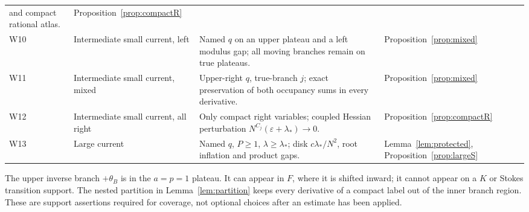 \documentclass[11pt]{article}
\numberwithin{equation}{section}
\theoremstyle{definition}
\newcommand{\eps}{\varepsilon}
\begin{document}
\begin{longtable}{>{\raggedright\arraybackslash}p{}>{\raggedright\arraybackslash}p{}>{\raggedright\arraybackslash}p{}>{\raggedright\arraybackslash}p{}}
and compact rational atlas. & Proposition~\ref{prop:compactR}\\
W10 & Intermediate small current, left &
Named \(q\) on an upper plateau and a left modulus gap;
all moving branches remain on true plateaus. &
Proposition~\ref{prop:mixed}\\
W11 & Intermediate small current, mixed &
Upper-right \(q\), true-branch \(j\); exact preservation of
both occupancy sums in every derivative. &
Proposition~\ref{prop:mixed}\\
W12 & Intermediate small current, all right &
Only compact right variables; coupled Hessian perturbation
\(N^{C_j}(\eps+\lambda_*)\to0\). &
Proposition~\ref{prop:compactR}\\
W13 & Large current &
Named \(q\), \(P\ge1\), \(\lambda\ge\lambda_*\);
disk \(c\lambda_*/N^2\), root inflation and product gaps. &
Lemma~\ref{lem:protected}, Proposition~\ref{prop:largeS}\\
\bottomrule
\end{longtable}
\normalsize

The upper inverse branch \(+\theta_B\) is in the \(a=p=1\)
plateau. It can appear in \(F\), where it is shifted inward;
it cannot appear on a \(K\) or Stokes transition support.
The nested partition in Lemma~\ref{lem:partition} keeps every
derivative of a compact label out of the inner branch region.
These are support assertions required for coverage, not
optional choices after an estimate has been applied.
\end{document}
